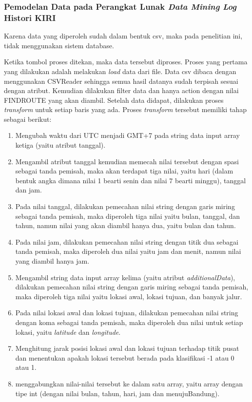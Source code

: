 \subsubsection{Pemodelan Data pada Perangkat Lunak \textsl{Data Mining Log} Histori KIRI}
Karena data yang diperoleh sudah dalam bentuk csv, maka pada penelitian ini, tidak menggunakan sistem database. 

Ketika tombol proses ditekan, maka data tersebut diproses. Proses yang pertama yang dilakukan adalah melakukan \textsl{load} data dari file. Data csv dibaca dengan menggunakan CSVReader sehingga semua hasil datanya sudah terpisah sesuai dengan atribut. Kemudian dilakukan filter data dan hanya action dengan nilai FINDROUTE yang akan diambil. Setelah data didapat, dilakukan proses \textsl{transform} untuk setiap baris yang ada. Proses \textsl{transform} tersebut memiliki tahap sebagai berikut:
\begin{enumerate}
	\item Mengubah waktu dari UTC menjadi GMT+7 pada string data input array ketiga (yaitu atribut tanggal).
	\item Mengambil atribut tanggal kemudian memecah nilai tersebut dengan spasi sebagai tanda pemisah, maka akan terdapat tiga nilai, yaitu hari (dalam bentuk angka dimana nilai 1 bearti senin dan nilai 7 bearti minggu), tanggal dan jam.
	\item Pada nilai tanggal, dilakukan pemecahan nilai string dengan garis miring sebagai tanda pemisah, maka diperoleh tiga nilai yaitu bulan, tanggal, dan tahun, namun nilai yang akan diambil hanya dua, yaitu bulan dan tahun.
	\item Pada nilai jam, dilakukan pemecahan nilai string dengan titik dua sebagai tanda pemisah, maka diperoleh dua nilai yaitu jam dan menit, namun nilai yang diambil hanya jam.
	\item Mengambil string data input array kelima (yaitu atribut \textsl{additionalData}), dilakukan pemecahan nilai string dengan garis miring sebagai tanda pemisah, maka diperoleh tiga nilai yaitu lokasi awal, lokasi tujuan, dan banyak jalur.
	\item Pada nilai lokasi awal dan lokasi tujuan, dilakukan pemecahan nilai string dengan koma sebagai tanda pemisah, maka diperoleh dua nilai untuk setiap lokasi, yaitu \textsl{latitude} dan \textsl{longitude}.
	\item Menghitung jarak posisi lokasi awal dan lokasi tujuan terhadap titik pusat dan menentukan apakah lokasi tersebut berada pada klasifikasi -1 atau 0 atau 1.
	\item menggabungkan nilai-nilai tersebut ke dalam satu array, yaitu array dengan tipe int (dengan nilai bulan, tahun, hari, jam dan menujuBandung).
\end{enumerate}

